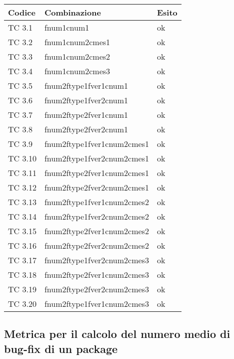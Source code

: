 \begin{tabular}{|p{3cm}|p{7cm}|p{3cm}|}
	\hline
	\rowcolor{Gray}
	\textbf{Codice} & \textbf{Combinazione} & \textbf{Esito}\tabularnewline
	\hline
	TC 3.1 			& fnum1cnum1 					& ok \tabularnewline
	\hline
	TC 3.2 			& fnum1cnum2cmes1 				& ok \tabularnewline
	\hline
	TC 3.3 			& fnum1cnum2cmes2 				& ok \tabularnewline
	\hline
	TC 3.4 			& fnum1cnum2cmes3 				& ok \tabularnewline
	\hline
	TC 3.5 			& fnum2ftype1fver1cnum1 			& ok \tabularnewline
	\hline
	TC 3.6 			& fnum2ftype1fver2cnum1				& ok \tabularnewline
	\hline
	TC 3.7 			& fnum2ftype2fver1cnum1 			& ok \tabularnewline
	\hline
	TC 3.8 			& fnum2ftype2fver2cnum1 			& ok \tabularnewline
	\hline
	TC 3.9 			& fnum2ftype1fver1cnum2cmes1 			& ok \tabularnewline
	\hline
	TC 3.10 		& fnum2ftype1fver2cnum2cmes1 			& ok \tabularnewline
	\hline
	TC 3.11 		& fnum2ftype2fver1cnum2cmes1 			& ok \tabularnewline
	\hline
	TC 3.12			& fnum2ftype2fver2cnum2cmes1 			& ok \tabularnewline
	\hline
	TC 3.13			& fnum2ftype1fver1cnum2cmes2 			& ok \tabularnewline
	\hline
	TC 3.14			& fnum2ftype1fver2cnum2cmes2 			& ok \tabularnewline
	\hline
	TC 3.15			& fnum2ftype2fver1cnum2cmes2 			& ok \tabularnewline
	\hline
	TC 3.16			& fnum2ftype2fver2cnum2cmes2 			& ok \tabularnewline
	\hline
	TC 3.17			& fnum2ftype1fver2cnum2cmes3 			& ok \tabularnewline
	\hline
	TC 3.18			& fnum2ftype2fver1cnum2cmes3 			& ok \tabularnewline
	\hline
	TC 3.19			& fnum2ftype2fver2cnum2cmes3 			& ok \tabularnewline
	\hline
	TC 3.20			& fnum2ftype1fver1cnum2cmes3 			& ok \tabularnewline
	\hline
\end{tabular}
\clearpage




\subsection{Metrica per il calcolo del numero medio di bug-fix di un package}

